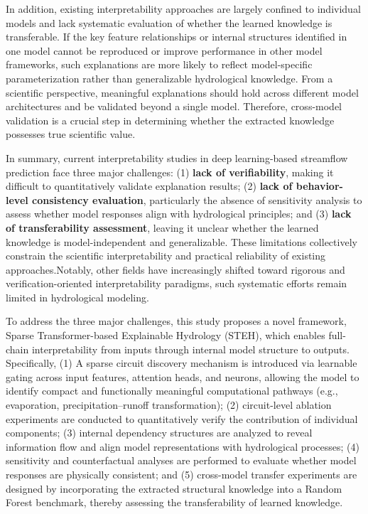 In addition, existing interpretability approaches are largely confined to individual models and lack systematic evaluation\cite{pmlr-v235-wang24j} of whether the learned knowledge is transferable. If the key feature relationships or internal structures identified in one model cannot be reproduced or improve performance in other model frameworks, such explanations are more likely to reflect model-specific parameterization rather than generalizable hydrological knowledge. From a scientific perspective, meaningful explanations should hold across different model architectures and be validated beyond a single model\cite{li2022transferability}. Therefore, cross-model validation is a crucial step in determining whether the extracted knowledge possesses true scientific value.

In summary, current interpretability studies in deep learning-based streamflow prediction face three major challenges: (1) \textbf{lack of verifiability}, making it difficult to quantitatively validate explanation results; (2) \textbf{lack of behavior-level consistency evaluation}, particularly the absence of sensitivity analysis to assess whether model responses align with hydrological principles; and (3) \textbf{lack of transferability assessment}, leaving it unclear whether the learned knowledge is model-independent and generalizable. These limitations collectively constrain the scientific interpretability and practical reliability of existing approaches.Notably, other fields have increasingly shifted toward rigorous and verification-oriented interpretability paradigms, such systematic efforts remain limited in hydrological modeling.

To address the three major challenges, this study proposes a novel framework, Sparse Transformer-based Explainable Hydrology (STEH), which enables full-chain interpretability from inputs through internal model structure to outputs. Specifically, (1) A sparse circuit discovery mechanism is introduced via learnable gating across input features, attention heads, and neurons, allowing the model to identify compact and functionally meaningful computational pathways (e.g., evaporation, precipitation–runoff transformation); (2) circuit-level ablation experiments are conducted to quantitatively verify the contribution of individual components; (3) internal dependency structures are analyzed to reveal information flow and align model representations with hydrological processes; (4) sensitivity and counterfactual analyses are performed to evaluate whether model responses are physically consistent; and (5) cross-model transfer experiments are designed by incorporating the extracted structural knowledge into a Random Forest benchmark, thereby assessing the transferability of learned knowledge.

